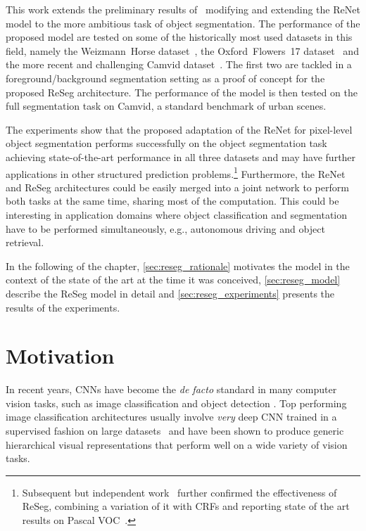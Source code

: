 This work extends the preliminary results of~\citep{visin2015renet} modifying
and extending the ReNet model to the more ambitious task of object
segmentation. The performance of the proposed model are tested on some of the
historically most used datasets in this field, namely the Weizmann~Horse
dataset~\citep{Borenstein04combiningtop-down}, the Oxford~Flowers~17
dataset~\citep{Nilsback06} and the more recent and challenging Camvid
dataset~\citep{Brostow2010semantic,BrostowECCV08}. The first two are
tackled in a foreground/background segmentation setting as a proof of concept
for the proposed ReSeg architecture. The performance of the model is then
tested on the full segmentation task on Camvid, a standard benchmark of urban
scenes.

The experiments show that the proposed adaptation of the ReNet for pixel-level
object segmentation performs successfully on the object segmentation task
achieving state-of-the-art performance in all three datasets and may have
further applications in other structured prediction problems.\footnote{
    Subsequent but independent work~\citep{DBLP:journals/corr/YanZJBY16}
    further confirmed the effectiveness of ReSeg, combining a variation of it
    with CRFs and reporting state of the art results on Pascal
    VOC~\citep{Everingham15}.}
Furthermore, the ReNet and ReSeg architectures could be easily merged into a
joint network to perform both tasks at the same time, sharing most of the
computation. This could be interesting in application domains where object
classification and segmentation have to be performed simultaneously,
e.g., autonomous driving and object retrieval.

In the following of the chapter, \autoref{sec:reseg_rationale} motivates the
model in the context of the state of the art at the time it was conceived,
\autoref{sec:reseg_model} describe the ReSeg model in detail and
\autoref{sec:reseg_experiments} presents the results of the experiments.


\section{Motivation}\label{sec:reseg_rationale}

In recent years, CNNs have become the {\em de facto} standard in many computer
vision tasks, such as image classification and object detection
\citep{Krizhevsky-2012,Erhan2014}. Top performing image classification
architectures usually involve {\em very} deep CNN trained in a supervised
fashion on large datasets~\citep{Lin2014,Simonyan2015, szegedy2014going} and
have been shown to produce generic hierarchical visual representations that
perform well on a wide variety of vision tasks.

